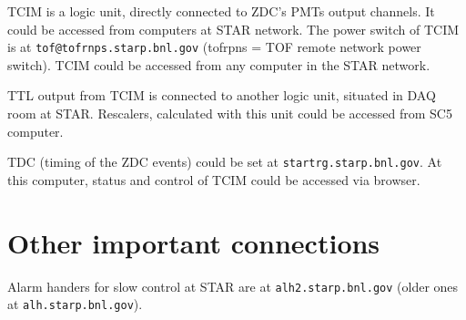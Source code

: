 TCIM is a logic unit, directly connected to ZDC's PMTs output channels. It could be accessed from computers at STAR network.
The power switch of TCIM is at \texttt{tof@tofrnps.starp.bnl.gov} (tofrpns = TOF remote network power switch).
TCIM could be accessed from any computer in the STAR network.

TTL output from TCIM is connected to another logic unit, situated in DAQ room at STAR. Rescalers, calculated with this unit could be accessed from SC5 computer.

TDC (timing of the ZDC events) could be set at \texttt{startrg.starp.bnl.gov}. At this computer, status and control of TCIM could be accessed via browser.

\section{Other important connections}
Alarm handers for slow control at STAR are at \texttt{alh2.starp.bnl.gov} (older ones at \texttt{alh.starp.bnl.gov}).